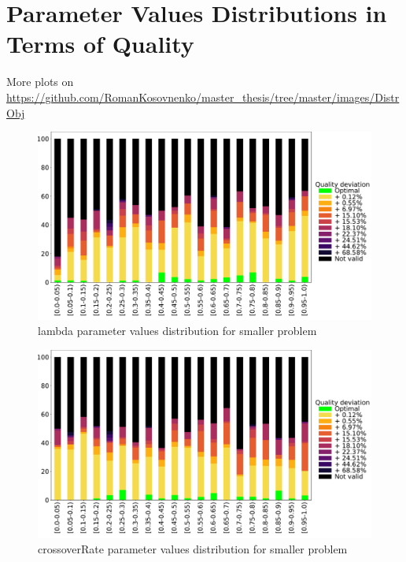 \chapter{Parameter Values Distributions in Terms of Quality}\label{appendix:Distributions3}
More plots on \url{https://github.com/RomanKosovnenko/master_thesis/tree/master/images/DistrObj}
\begin{figure}[!htb]
	\centering
	\includegraphics[width=\textwidth]{images/DistrObj/lambda.pdf}
	\caption[]{lambda parameter values distribution for smaller problem}
	\label{fig:lambda_Obj}
\end{figure}

\begin{figure}
	\centering
	\includegraphics[width=\textwidth]{images/DistrObj/crossoverRate.pdf}
	\caption[]{crossoverRate parameter values distribution for smaller problem}  
	\label{fig:crossoverRate_Obj}
\end{figure}

